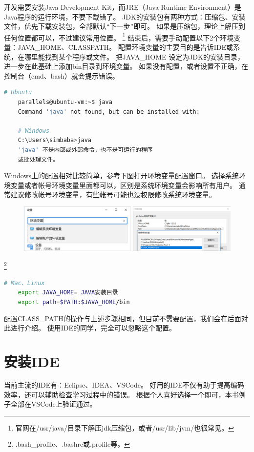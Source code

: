 开发需要安装Java Development Kit，而JRE（Java Runtime Environment）是Java程序的运行环境，不要下载错了。
JDK的安装包有两种方式：压缩包、安装文件，优先下载安装包，全部默认“下一步”即可。
如果是压缩包，理论上解压到任何位置都可以，不过建议常用位置。
\footnote{官网在/usr/java/目录下解压jdk压缩包，或者/usr/lib/jvm/也很常见。}
结束后，需要手动配置以下2个环境变量：JAVA\_HOME、CLASSPATH。
配置环境变量的主要目的是告诉IDE或系统，在哪里能找到某个程序或文件。
把JAVA\_HOME
设定为JDK的安装目录，进一步在此基础上添加bin目录到环境变量。
如果没有配置，或者设置不正确，在控制台（cmd、bash）就会提示错误。
\begin{lstlisting}[language=bash]
	# Ubuntu
	parallels@ubuntu-vm:~$ java
	Command 'java' not found, but can be installed with:

	# Windows
	C:\Users\simbaba>java
	'java' 不是内部或外部命令，也不是可运行的程序
	或批处理文件。
\end{lstlisting}

Windows上的配置相对比较简单，参考下图打开环境变量配置窗口。
选择系统环境变量或者帐号环境变量里面都可以，区别是系统环境变量会影响所有用户。
通常建议修改帐号环境变量，有些帐号可能也没权限修改系统环境变量。

\begin{figure}[!htb]
	\centerline{\includegraphics[scale=.7]{images/windows_java_set.png}}
\end{figure}

\footnote{.bash\_profile、.bashrc或.profile等。}
\begin{lstlisting}[language=bash]
	# Mac、Linux
	export JAVA_HOME= JAVA安装目录
	export path=$PATH:$JAVA_HOME/bin
\end{lstlisting}

配置CLASS\_PATH的操作与上述步骤相同，但目前不需要配置，我们会在后面对此进行介绍。
使用IDE的同学，完全可以忽略这个配置。

\section{安装IDE}
当前主流的IDE有：Eclipse、IDEA、VSCode。
好用的IDE不仅有助于提高编码效率，还可以辅助检查学习过程中的错误。
根据个人喜好选择一个即可，本书例子全部在VSCode上验证通过。

